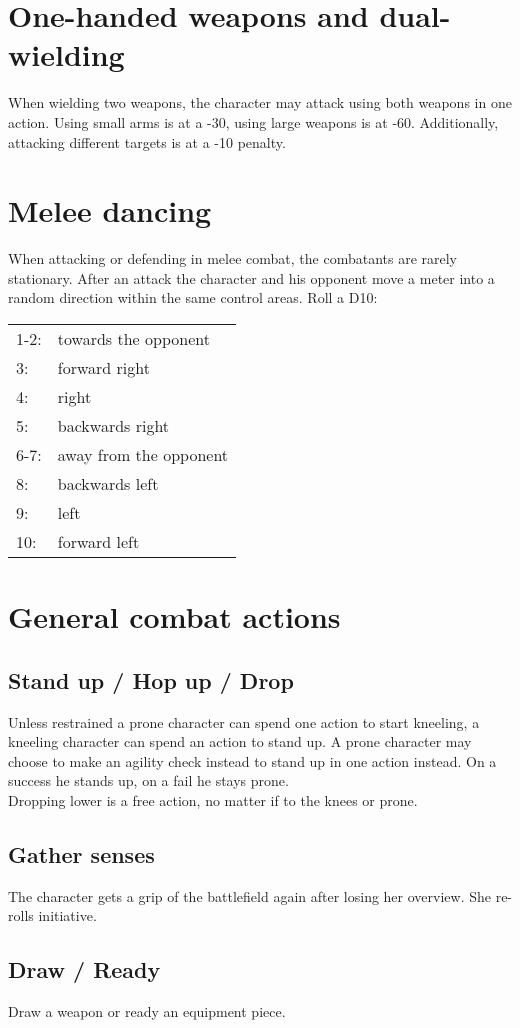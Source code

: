 \documentclass[12pt,a4paper,openany]{book}
\begin{document}
	\section{One-handed weapons and dual-wielding}
	When wielding two weapons, the character may attack using both weapons in one action. Using small arms is at a -30, using large weapons is at -60. Additionally, attacking different targets is at a -10 penalty.
	\section{Melee dancing}
	When attacking or defending in melee combat, the combatants are rarely stationary. After an attack the character and his opponent move a meter into a random direction within the same control areas. Roll a D10:
	
	\begin{tabular}{ll}
		1-2: & towards the opponent\\
		3:   & forward right\\
		4:   & right\\
		5:   & backwards right\\
		6-7: & away from the opponent\\
		8:   & backwards left\\
		9:   & left\\
		10:  & forward left
	\end{tabular}

	\newpage
	\section{General combat actions}
	\subsection*{Stand up / Hop up / Drop}
	Unless restrained a prone character can spend one action to start kneeling, a kneeling character can spend an action to stand up. A prone character may choose to make an agility check instead to stand up in one action instead. On a success he stands up, on a fail he stays prone.\\
	Dropping lower is a free action, no matter if to the knees or prone.
	\subsection*{Gather senses}
	The character gets a grip of the battlefield again after losing her overview. She re-rolls initiative.
	\subsection*{Draw / Ready}
	Draw a weapon or ready an equipment piece.
\end{document}
